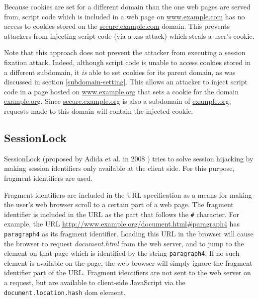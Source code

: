 Because cookies are set for a different domain than the one web pages are served from, script code which is included in a web page on \url{www.example.com} has no access to cookies stored on the \url{secure.example.com} domain. This prevents attackers from injecting script code (via a \gls{xss} attack) which steals a user's cookie.

Note that this approach does not prevent the attacker from executing a session fixation attack. Indeed, although script code is unable to access cookies stored in a different subdomain, it \emph{is} able to set cookies for its parent domain, as was discussed in section \ref{subdomain-setting}. This allows an attacker to inject script code in a page hosted on \url{www.example.org} that sets a cookie for the domain \url{example.org}. Since \url{secure.example.org} is also a subdomain of \url{example.org}, requests made to this domain will contain the injected cookie.

\subsection{SessionLock}

SessionLock (proposed by Adida et al. in 2008 \cite{Adida2008}) tries to solve session hijacking by making session identifiers only available at the client side. For this purpose, fragment identifiers are used.

Fragment identifiers are included in the URL specification \cite{rfc3986} as a means for making the user's web browser scroll to a certain part of a web page. The fragment identifier is included in the URL as the part that follows the \texttt{\#} character. For example, the URL \url{http://www.example.org/document.html#paragraph4} has \texttt{paragraph4} as its fragment identifier. Loading this URL in the browser will cause the browser to request \emph{document.html} from the web server, and to jump to the element on that page which is identified by the string \texttt{paragraph4}. If no such element is available on the page, the web browser will simply ignore the fragment identifier part of the URL. Fragment identifiers are not sent to the web server on a request, but are available to client-side JavaScript via the \texttt{document.location.hash} \gls{dom} element.

